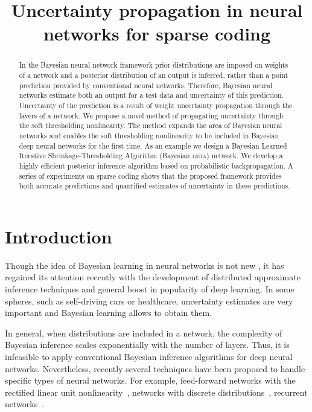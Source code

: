 \documentclass{article}
\title{Uncertainty propagation in neural networks for sparse coding}
\author{} %
\begin{document}
\maketitle

\begin{abstract}
In the Bayesian neural network framework prior distributions are imposed on weights of a network and a posterior distribution of an output is inferred, rather than a point prediction provided by conventional neural networks. Therefore, Bayesian neural networks estimate both an output for a test data and uncertainty of this prediction. Uncertainty of the prediction is a result of weight uncertainty propagation through the layers of a network. We propose a novel method of propagating uncertainty through the soft thresholding nonlinearity. The method expands the area of Bayesian neural networks and enables the soft thresholding nonlinearity to be included in Bayesian deep neural networks for the first time. As an example we design a Bayesian Learned Iterative Shrinkage-Thresholding Algorithm (Bayesian \textsc{lista}) network. We develop a highly efficient posterior inference algorithm based on probabilistic backpropagation. A series of experiments on sparse coding shows that the proposed framework provides both accurate predictions and quantified estimates of uncertainty in these predictions.
\end{abstract}

\section{Introduction}
Though the idea of Bayesian learning in neural networks is not new \citep{neal2012bayesian}, it has regained its attention recently with the development of distributed approximate inference techniques \citep{li2015stochastic, hoffman2013stochastic}  and general boost in popularity of deep learning. In some spheres, such as self-driving cars or healthcare, uncertainty estimates are very important and Bayesian learning allows to obtain them.

In general, when distributions are included in a network, the complexity of Bayesian inference scales exponentially with the number of layers. Thus, it is infeasible to apply conventional Bayesian inference algorithms for deep neural networks. Nevertheless, recently several techniques have been proposed to handle specific types of neural networks. For example, feed-forward networks with the rectified linear unit nonlinearity~\citep{hernandez2015probabilistic}, networks with discrete distributions~\citep{soudry2014expectation}, recurrent networks~\citep{mcdermott2017bayesian}.
\end{document}
